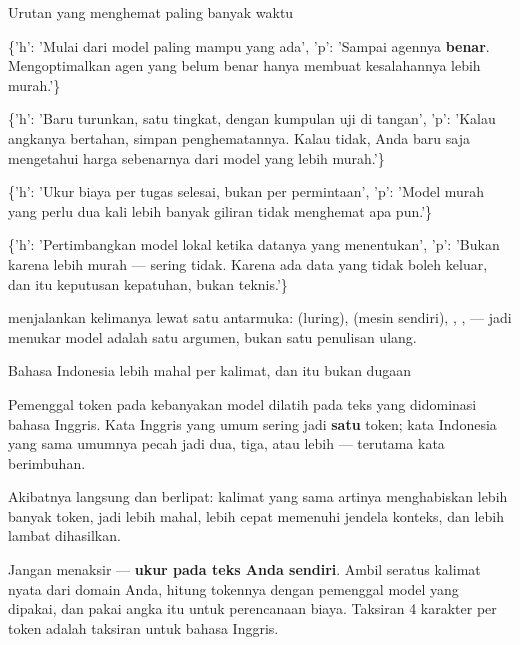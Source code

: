 \documentclass[aspectratio=169,11pt,t]{beamer}
\begin{document}
\begin{frame}[shrink=25]{Urutan yang menghemat paling banyak waktu}
\begin{isteps}
\item \{'h': 'Mulai dari model paling mampu yang ada', 'p': 'Sampai agennya \textbf{benar}. Mengoptimalkan agen yang belum benar hanya membuat kesalahannya lebih murah.'\}
\item \{'h': 'Baru turunkan, satu tingkat, dengan kumpulan uji di tangan', 'p': 'Kalau angkanya bertahan, simpan penghematannya. Kalau tidak, Anda baru saja mengetahui harga sebenarnya dari model yang lebih murah.'\}
\item \{'h': 'Ukur biaya per tugas selesai, bukan per permintaan', 'p': 'Model murah yang perlu dua kali lebih banyak giliran tidak menghemat apa pun.'\}
\item \{'h': 'Pertimbangkan model lokal ketika datanya yang menentukan', 'p': 'Bukan karena lebih murah --- sering tidak. Karena ada data yang tidak boleh keluar, dan itu keputusan kepatuhan, bukan teknis.'\}
\end{isteps}
\begin{iband}[signal]
 menjalankan kelimanya lewat satu antarmuka:  (luring),  (mesin sendiri), , ,  --- jadi menukar model adalah satu argumen, bukan satu penulisan ulang.
\end{iband}
\end{frame}

\begin{frame}[shrink=25]{Bahasa Indonesia lebih mahal per kalimat, dan itu bukan dugaan}
{\fontsize{9.4}{12.6}\selectfont\color{fg2}Pemenggal token pada kebanyakan model dilatih pada teks yang didominasi bahasa Inggris. Kata Inggris yang umum sering jadi \textbf{satu} token; kata Indonesia yang sama umumnya pecah jadi dua, tiga, atau lebih --- terutama kata berimbuhan.\par}\vskip 4pt
{\fontsize{9.4}{12.6}\selectfont\color{fg2}Akibatnya langsung dan berlipat: kalimat yang sama artinya menghabiskan lebih banyak token, jadi lebih mahal, lebih cepat memenuhi jendela konteks, dan lebih lambat dihasilkan.\par}\vskip 4pt
\begin{iband}[signal]
Jangan menaksir --- \textbf{ukur pada teks Anda sendiri}. Ambil seratus kalimat nyata dari domain Anda, hitung tokennya dengan pemenggal model yang dipakai, dan pakai angka itu untuk perencanaan biaya. Taksiran 4 karakter per token adalah taksiran untuk bahasa Inggris.
\end{iband}
\end{frame}
\end{document}
